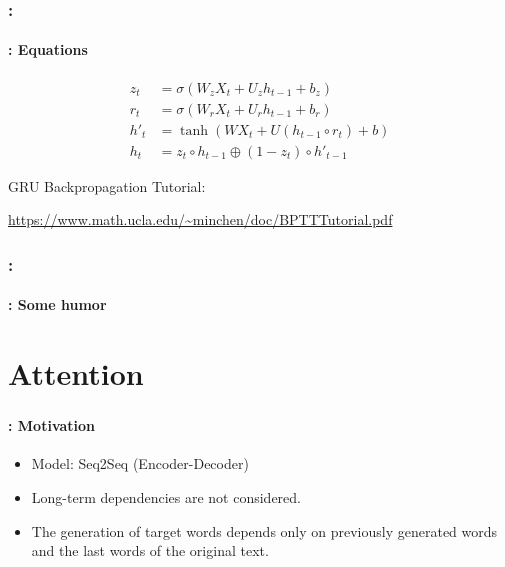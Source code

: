 \documentclass[xcolor=table]{beamer}
\begin{document}
\begin{frame}
	\frametitle{\insertshortsubtitle: \insertsection}
	\framesubtitle{\insertsubsection: Equations}
	
	{\huge\vskip-24pt
	\begin{align*}
	z_t &= \sigma(W_z X_t + U_z h_{t-1} + b_z) \\
	r_t &= \sigma(W_r X_t + U_r h_{t-1} + b_r) \\
	h'_t &= \tanh(W X_t + U (h_{t-1} \circ r_t) + b) \\
	h_t &= z_t \circ h_{t-1} \oplus (1-z_t) \circ h'_{t-1}
	\end{align*}
	}
	
	\vskip12pt
	GRU Backpropagation Tutorial:
	
	\url{https://www.math.ucla.edu/~minchen/doc/BPTTTutorial.pdf}
	
\end{frame}

\begin{frame}
	\frametitle{\insertshortsubtitle: \insertsection}
	\framesubtitle{\insertsubsection: Some humor}
	
	\begin{center}
	\end{center}
	
\end{frame}


\section{Attention}

\begin{frame}
	\frametitle{\insertshortsubtitle}
	\framesubtitle{\insertsection: Motivation}
	
	\begin{center}
	\end{center}

	\begin{itemize}
		\item Model: Seq2Seq (Encoder-Decoder)
		\item Long-term dependencies are not considered.
		\item The generation of target words depends only on previously generated words and the last words of the original text.
	\end{itemize}
	
\end{frame}
\end{document}
